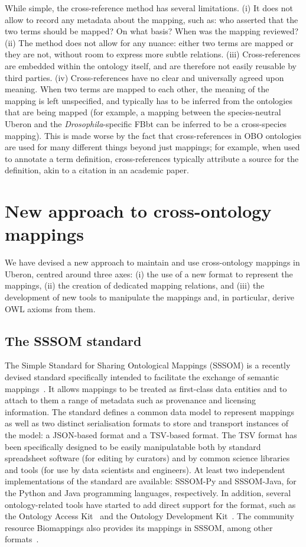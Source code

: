 \documentclass{ceurart}
\def\species#1{\textit{#1}}
\begin{document}
While simple, the cross-reference method has several limitations. (i) It
does not allow to record any metadata about the mapping, such as: who
asserted that the two terms should be mapped? On what basis? When was
the mapping reviewed?  (ii) The method does not allow for any nuance:
either two terms are mapped or they are not, without room to express
more subtle relations. (iii) Cross-references are embedded within the
ontology itself, and are therefore not easily reusable by third parties.
(iv) Cross-references have no clear and universally agreed upon meaning.
When two terms are mapped to each other, the meaning of the mapping is
left unspecified, and typically has to be inferred from the ontologies
that are being mapped (for example, a mapping between the
species-neutral Uberon and the \species{Drosophila}-specific FBbt can be
inferred to be a cross-species mapping). This is made worse by the fact
that cross-references in OBO ontologies are used for many different
things beyond just mappings; for example, when used to annotate a term
definition, cross-references typically attribute a source for the
definition, akin to a citation in an academic paper.

\section{New approach to cross-ontology mappings}

We have devised a new approach to maintain and use cross-ontology
mappings in Uberon, centred around three axes: (i) the use of a new
format to represent the mappings, (ii) the creation of dedicated mapping
relations, and (iii) the development of new tools to manipulate the
mappings and, in particular, derive OWL axioms from them.

\subsection{The SSSOM standard}

The Simple Standard for Sharing Ontological Mappings (SSSOM) is a
recently devised standard specifically intended to facilitate the
exchange of semantic mappings~\cite{matentzoglu2022b}. It allows
mappings to be treated as first-class data entities and to attach to
them a range of metadata such as provenance and licensing information.
The standard defines a common data model to represent mappings as well
as two distinct serialisation formats to store and transport instances
of the model: a JSON-based format and a TSV-based format. The TSV format
has been specifically designed to be easily manipulatable both by
standard spreadsheet software (for editing by curators) and by common
science libraries and tools (for use by data scientists and engineers).
At least two independent implementations of the standard are available:
SSSOM-Py and SSSOM-Java, for the Python and Java programming languages,
respectively. In addition, several ontology-related tools have started
to add direct support for the format, such as the Ontology Access
Kit~\cite{mungall2023} and the Ontology Development
Kit~\cite{matentzoglu2022a}. The community resource Biomappings also
provides its mappings in SSSOM, among other formats~\cite{hoyt2023}.
\end{document}
